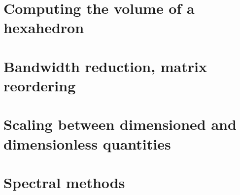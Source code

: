 \section{Computing the volume of a hexahedron}  %
\newpage %
\section{Bandwidth reduction, matrix reordering}  %
\newpage %
\section{Scaling between dimensioned and dimensionless quantities} 

\newpage %
\section{Spectral methods} 



